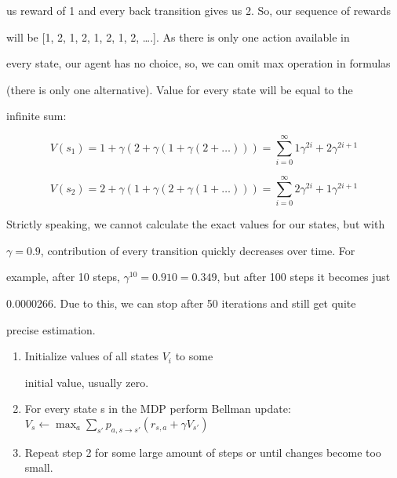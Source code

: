 us reward of 1 and every back transition gives us 2. So, our sequence of rewards

will be [1, 2, 1, 2, 1, 2, 1, 2, ….]. As there is only one action available in

every state, our agent has no choice, so, we can omit max operation in formulas

(there is only one alternative). Value for every state will be equal to the

infinite sum:



\begin{equation*}

V(s_1) = 1 + \gamma (2 + \gamma(1 + \gamma(2 + \ldots))) = \sum_{i=0}^\infty 1\gamma^{2i}+2\gamma^{2i+1}

\end{equation*}



\begin{equation*}

V(s_2) = 2 + \gamma (1 + \gamma(2 + \gamma(1 + \ldots))) = \sum_{i=0}^\infty 2\gamma^{2i}+1\gamma^{2i+1}

\end{equation*}


Strictly speaking, we cannot calculate the exact values for our states, but with

\begin{math}\gamma=0.9\end{math}, contribution of every transition quickly decreases over time. For

example, after 10 steps, \begin{math}\gamma^{10} = 0.910 = 0.349\end{math}, but after 100 steps it becomes just

0.0000266. Due to this, we can stop after 50 iterations and still get quite

precise estimation.




\begin{enumerate}

\item Initialize values of all states \begin{math}V_i\end{math} to some

initial value, usually zero.


\item For every state s in the MDP perform Bellman update: \begin{math}V_s \leftarrow

\max_a \sum_{s'}p_{a,s \rightarrow s'}(r_{s,a} + \gamma V_{s'})\end{math}

\item Repeat step 2 for some large amount of steps or until changes become too small.

\end{enumerate}


